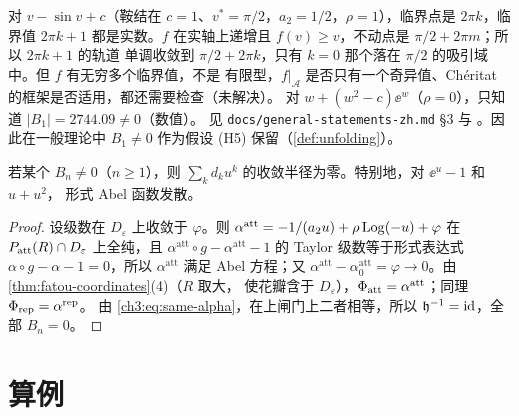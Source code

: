 \begin{remark}[其他族的状态]\label{ch3:rem:other-families}
对 $v-\sin v+c$（鞍结在 $c=1$、$v^*=\pi/2$，$a_2=1/2$，$\rho=1$），临界点是 $2\pi k$，临界值
$2\pi k+1$ 都是实数。$f$ 在实轴上递增且 $f(v)\ge v$，不动点是 $\pi/2+2\pi m$；所以 $2\pi k+1$ 的轨道
单调收敛到 $\pi/2+2\pi k$，只有 $k=0$ 那个落在 $\pi/2$ 的吸引域中。但 $f$ 有无穷多个临界值，不是
有限型，$f|_{\mathcal A}$ 是否只有一个奇异值、Chéritat 的框架是否适用，都还需要检查（未解决）。
对 $w+(w^2-c)\ee^w$（$\rho=0$），只知道 $|B_1|=2744.09\ne0$（数值）。
见 \texttt{docs/general-statements-zh.md} §3 与 \cite[\S9, Remark~9.5]{KneserPaper}。因此在一般理论中
$B_1\ne0$ 作为假设 (H5) 保留（\cref{def:unfolding}）。
\end{remark}

\begin{corollary}\label{ch3:cor:divergence}
若某个 $B_n\ne0$（$n\ge1$），则 $\sum_kd_ku^k$ 的收敛半径为零。特别地，对 $\ee^u-1$ 和 $u+u^2$，
形式 Abel 函数发散。
\end{corollary}

\begin{proof}
设级数在 $D_\varepsilon$ 上收敛于 $\varphi$。则 $\alpha^{\mathrm{att}}=-1/(a_2u)+\rho\operatorname{Log}(-u)+\varphi$
在 $P_{\mathrm{att}}(R)\cap D_\varepsilon$ 上全纯，且 $\alpha^{\mathrm{att}}\circ g-\alpha^{\mathrm{att}}-1$ 的 Taylor
级数等于形式表达式 $\alpha\circ g-\alpha-1=0$，所以 $\alpha^{\mathrm{att}}$ 满足 Abel 方程；又
$\alpha^{\mathrm{att}}-\alpha_0^{\mathrm{att}}=\varphi\to0$。由\cref{thm:fatou-coordinates}(4)（$R$ 取大，
使花瓣含于 $D_\varepsilon$），$\Phi_{\mathrm{att}}=\alpha^{\mathrm{att}}$；同理 $\Phi_{\mathrm{rep}}=\alpha^{\mathrm{rep}}$。
由 \eqref{ch3:eq:same-alpha}，在上闸门上二者相等，所以 $\mathfrak h^{-1}=\mathrm{id}$，全部 $B_n=0$。
\end{proof}

\section{算例}\label{ch3:sec:examples}

